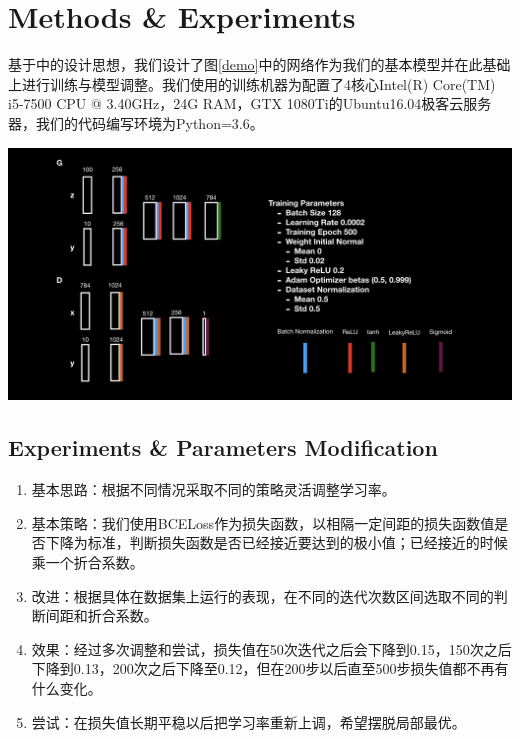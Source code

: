 \documentclass[12pt]{article}
\begin{document}
\section*{Methods \& Experiments}

  基于\cite{DBLP:journals/corr/MirzaO14}中的设计思想，我们设计了图\ref{demo}中的网络作为我们的基本模型并在此基础上进行训练与模型调整。我们使用的训练机器为配置了4核心Intel(R) Core(TM) i5-7500 CPU @ 3.40GHz，24G RAM，GTX 1080Ti的Ubuntu16.04极客云服务器，我们的代码编写环境为Python=3.6。
\begin{center}\vspace{1cm}
\includegraphics[width=1.0\linewidth]{demo.jpeg}
\label{demo}
\end{center}\vspace{1cm}


\subsection*{Experiments \& Parameters Modification}
\begin{enumerate}
	\item 基本思路：根据不同情况采取不同的策略灵活调整学习率。
	\item 基本策略：我们使用BCELoss作为损失函数，以相隔一定间距的损失函数值是否下降为标准，判断损失函数是否已经接近要达到的极小值；已经接近的时候乘一个折合系数。
	\item 改进：根据具体在数据集上运行的表现，在不同的迭代次数区间选取不同的判断间距和折合系数。
	\item 效果：经过多次调整和尝试，损失值在50次迭代之后会下降到0.15，150次之后下降到0.13，200次之后下降至0.12，但在200步以后直至500步损失值都不再有什么变化。
	\item 尝试：在损失值长期平稳以后把学习率重新上调，希望摆脱局部最优。
\end{enumerate}
\end{document}
